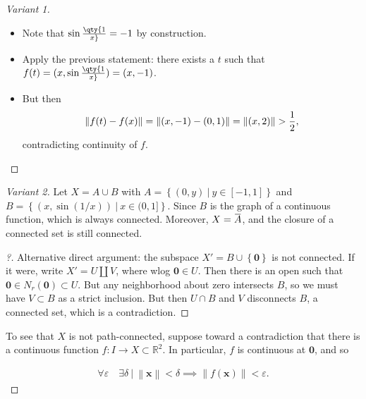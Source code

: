 \begin{solution}
\begin{proof}[Variant 1]
\begin{itemize}
\begin{itemize}
    \begin{itemize}
    \tightlist
    \item
      Note that \(\sin\qty{1\over x} = -1\) by construction.
    \item
      Apply the previous statement: there exists a \(t\) such that
      \(f(t) = (x, \sin\qty{1\over x}) = (x, -1)\).
    \item
      But then
      \begin{align*}
      {\left\lVert {f(t) - f(x)} \right\rVert} = {\left\lVert {(x, -1) - (0, 1)} \right\rVert} = {\left\lVert {(x, 2)} \right\rVert} > {1\over 2}
      ,\end{align*}
      contradicting continuity of \(f\).
    \end{itemize}
  \end{itemize}
\end{itemize}

\end{proof}

\begin{proof}[Variant 2]

Let \(X = A \cup B\) with
\(A = \left\{{(0, y) {~\mathrel{\Big|}~}y\in [-1, 1] }\right\}\) and
\(B = \left\{{(x, \sin(1/x)) {~\mathrel{\Big|}~}x\in (0, 1]}\right\}\).
Since \(B\) is the graph of a continuous function, which is always
connected. Moreover,
\(X = \mkern 1.5mu\overline{\mkern-1.5muA\mkern-1.5mu}\mkern 1.5mu\),
and the closure of a connected set is still connected.

\begin{proof}[?]

Alternative direct argument: the subspace
\(X' = B \cup\left\{{\mathbf{0}}\right\}\) is not connected. If it were,
write \(X' = U {\textstyle\coprod}V\), where wlog \(\mathbf{0} \in U\).
Then there is an open such that
\(\mathbf{0} \in N_r(\mathbf{0}) \subset U\). But any neighborhood about
zero intersects \(B\), so we must have \(V \subset B\) as a strict
inclusion. But then \(U \cap B\) and \(V\) disconnects \(B\), a
connected set, which is a contradiction.

\end{proof}

To see that \(X\) is not path-connected, suppose toward a contradiction
that there is a continuous function
\(f: I \to X \subset {\mathbb{R}}^2\). In particular, \(f\) is
continuous at \(\mathbf{0}\), and so

\begin{align*} \forall \varepsilon \quad \exists \delta {~\mathrel{\Big|}~}{\left\lVert {\mathbf{x}} \right\rVert} < \delta \implies {\left\lVert {f(\mathbf{x})} \right\rVert} < \varepsilon .\end{align*}


\end{proof}
\end{solution}
